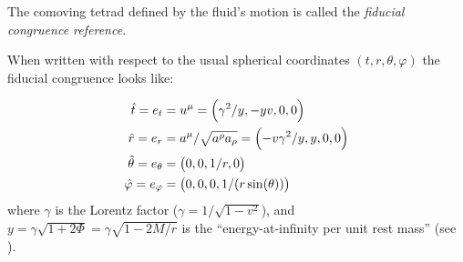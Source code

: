 \documentclass[main.tex]{subfiles}
\begin{document}
The comoving tetrad defined by the fluid's motion is called the \emph{fiducial congruence reference}.

\begin{claim}
When written with respect to the usual spherical coordinates \((t, r, \theta, \varphi)\) the fiducial congruence looks like:

\begin{subequations} \label{eq:fiducial-frame}
    \begin{align}
        \hat{t} = e_t &= u^\mu = \qty(\gamma^2 / y, -yv, 0,0)  \\
        \hat{r} = e_r &= a^\mu / \sqrt{a^\rho a_\rho} = \qty(-v \gamma^2 /y, y, 0, 0) \\
        \hat{\theta} =  e_\theta &= \qty(0,0, 1/r, 0)  \\
        \hat{\varphi} =  e_ \varphi &= \qty(0,0,0, 1/(r \sin(\theta)))
    \end{align}
\end{subequations}
where \(\gamma\) is the Lorentz factor ($\gamma = 1/\sqrt{1-v^2}$), and $y=\gamma \sqrt{1+2\Phi} = \gamma \sqrt{1 - 2M/r} $ is the ``energy-at-infinity per unit rest mass'' (see \cite[equation 3]{ThorneFLammmangZytkow:1981feb}).
\end{claim}
\end{document}
